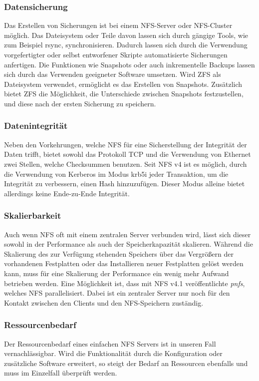 \subsubsection{Datensicherung}
Das Erstellen von Sicherungen ist bei einem \ac{NFS}-Server oder \ac{NFS}-Cluster möglich. Das Dateisystem oder Teile davon lassen sich durch gängige Tools, wie zum Beispiel rsync, synchronisieren. Dadurch lassen sich durch die Verwendung vorgefertigter oder selbst entworfener Skripte automatisierte Sicherungen anfertigen. Die Funktionen wie Snapshots oder auch inkrementelle Backups lassen sich durch das Verwenden geeigneter Software umsetzen. Wird ZFS als Dateisystem verwendet, ermöglicht es das Erstellen von Snapshots. Zusätzlich bietet ZFS die Möglichkeit, die Unterschiede zwischen Snapshots festzustellen, und diese nach der ersten Sicherung zu speichern.

\subsubsection{Datenintegrität}
Neben den Vorkehrungen, welche \ac{NFS} für eine Sicherstellung der Integrität der Daten trifft, bietet sowohl das Protokoll TCP und die Verwendung von Ethernet zwei Stellen, welche Checksummen benutzen. Seit \ac{NFS} v4 ist es möglich, durch die Verwendung von Kerberos im Modus krb5i jeder Transaktion, um die Integrität zu verbessern, einen Hash hinzuzufügen. Dieser Modus alleine bietet allerdings keine Ende-zu-Ende Integrität.

\subsubsection{Skalierbarkeit}
Auch wenn \ac{NFS} oft mit einem zentralen Server verbunden wird, lässt sich dieser sowohl in der Performance als auch der Speicherkapazität skalieren. Während die Skalierung des zur Verfügung stehenden Speichers über das Vergrößern der vorhandenen Festplatten oder das Installieren neuer Festplatten gelöst werden kann, muss für eine Skalierung der Performance ein wenig mehr Aufwand betrieben werden. Eine Möglichkeit ist, dass mit \ac{NFS} v4.1 veröffentlichte \textit{pnfs}, welches \ac{NFS} parallelisiert. Dabei ist ein zentraler Server nur noch für den Kontakt zwischen den Clients und den \ac{NFS}-Speichern zuständig.

\subsubsection{Ressourcenbedarf}
Der Ressourcenbedarf eines einfachen \ac{NFS} Servers ist in unseren Fall vernachlässigbar. Wird die Funktionalität durch die Konfiguration oder zusätzliche Software erweitert, so steigt der Bedarf an Ressourcen ebenfalls und muss im Einzelfall überprüft werden.

